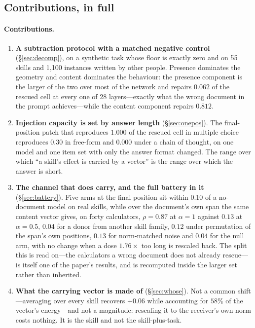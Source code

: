 \documentclass{article}
\begin{document}
\subsection{Contributions, in full}
\label{app:contrib}

\paragraph{Contributions.}
\begin{enumerate}
\item \textbf{A subtraction protocol with a matched negative control}
(\S\ref{sec:decomp}), on a synthetic task whose floor is exactly zero and on 55
skills and 1{,}100 instances written by other people. Presence dominates the
geometry and content dominates the behaviour: the presence component is the
larger of the two over most of the network and repairs $0.062$ of the rescued
cell at every one of 28 layers---exactly what the wrong document in the prompt
achieves---while the content component repairs $0.812$.
\item \textbf{Injection capacity is set by answer length} (\S\ref{sec:onepos}).
The final-position patch that reproduces $1.000$ of the rescued cell in multiple
choice reproduces $0.30$ in free-form and $0.000$ under a chain of thought, on
one model and one item set with only the answer format changed. The range over
which ``a skill's effect is carried by a vector'' is the range over which the
answer is short.
\item \textbf{The channel that does carry, and the full battery in it}
(\S\ref{sec:battery}). Five arms at the final position sit within $0.10$ of a
no-document model on real skills, while over the document's own span the same
content vector gives, on forty calculators, $\rho = 0.87$ at $\alpha=1$ against
$0.13$ at $\alpha=0.5$, $0.04$ for a donor from another skill family, $0.12$
under permutation of the span's own positions, $0.13$ for norm-matched noise and
$0.04$ for the null arm, with no change when a dose $1.76\times$ too long is
rescaled back. The split this is read on---the calculators a wrong document does
not already rescue---is itself one of the paper's results, and is recomputed
inside the larger set rather than inherited.
\item \textbf{What the carrying vector is made of} (\S\ref{sec:whose}). Not a
common shift---averaging over every skill recovers $+0.06$ while accounting for
$58\%$ of the vector's energy---and not a magnitude: rescaling it to the
receiver's own norm costs nothing. It is the skill and not the skill-plus-task.

\end{enumerate}
\end{document}
